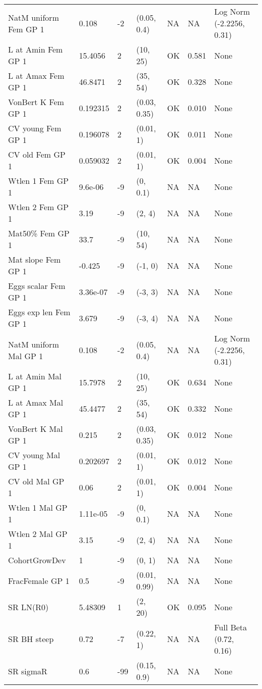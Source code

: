 \documentclass[11pt,
  english,
  letterpaper,
]{article}
\begin{document}
\begin{landscape}
\begin{longtable}[t]{>{\raggedright\arraybackslash}p{7.5cm}lllll>{\raggedright\arraybackslash}p{3.5cm}}
\endfoot
\bottomrule
\endlastfoot
NatM uniform Fem GP 1 & 0.108 & -2 & (0.05, 0.4) & NA & NA & Log Norm (-2.2256, 0.31)\\
L at Amin Fem GP 1 & 15.4056 & 2 & (10, 25) & OK & 0.581 & None\\
L at Amax Fem GP 1 & 46.8471 & 2 & (35, 54) & OK & 0.328 & None\\
VonBert K Fem GP 1 & 0.192315 & 2 & (0.03, 0.35) & OK & 0.010 & None\\
CV young Fem GP 1 & 0.196078 & 2 & (0.01, 1) & OK & 0.011 & None\\
CV old Fem GP 1 & 0.059032 & 2 & (0.01, 1) & OK & 0.004 & None\\
Wtlen 1 Fem GP 1 & 9.6e-06 & -9 & (0, 0.1) & NA & NA & None\\
Wtlen 2 Fem GP 1 & 3.19 & -9 & (2, 4) & NA & NA & None\\
Mat50\% Fem GP 1 & 33.7 & -9 & (10, 54) & NA & NA & None\\
Mat slope Fem GP 1 & -0.425 & -9 & (-1, 0) & NA & NA & None\\
Eggs scalar Fem GP 1 & 3.36e-07 & -9 & (-3, 3) & NA & NA & None\\
Eggs exp len Fem GP 1 & 3.679 & -9 & (-3, 4) & NA & NA & None\\
NatM uniform Mal GP 1 & 0.108 & -2 & (0.05, 0.4) & NA & NA & Log Norm (-2.2256, 0.31)\\
L at Amin Mal GP 1 & 15.7978 & 2 & (10, 25) & OK & 0.634 & None\\
L at Amax Mal GP 1 & 45.4477 & 2 & (35, 54) & OK & 0.332 & None\\
VonBert K Mal GP 1 & 0.215 & 2 & (0.03, 0.35) & OK & 0.012 & None\\
CV young Mal GP 1 & 0.202697 & 2 & (0.01, 1) & OK & 0.012 & None\\
CV old Mal GP 1 & 0.06 & 2 & (0.01, 1) & OK & 0.004 & None\\
Wtlen 1 Mal GP 1 & 1.11e-05 & -9 & (0, 0.1) & NA & NA & None\\
Wtlen 2 Mal GP 1 & 3.15 & -9 & (2, 4) & NA & NA & None\\
CohortGrowDev & 1 & -9 & (0, 1) & NA & NA & None\\
FracFemale GP 1 & 0.5 & -9 & (0.01, 0.99) & NA & NA & None\\
SR LN(R0) & 5.48309 & 1 & (2, 20) & OK & 0.095 & None\\
SR BH steep & 0.72 & -7 & (0.22, 1) & NA & NA & Full Beta (0.72, 0.16)\\
SR sigmaR & 0.6 & -99 & (0.15, 0.9) & NA & NA & None\\

\end{longtable}
\end{landscape}
\end{document}
